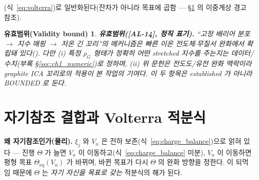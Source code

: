 \documentclass[11pt,a4paper]{article}
\newtheorem*{boundbox}{유효범위(Validity bound)}
\newcommand{\eq}{\mathrm{eq}}
\newcommand{\AL}[1]{\textsf{[AL-#1]}}
\begin{document}
(식~\eqref{eq:volterra})로 일반화된다(잔차가 아니라 목표에 곱함 — \S\ref{sec:volterra} 의 이중계상 경고 참조).
\begin{boundbox}
\textbf{유효범위(\AL{14}, 정직 표기).} ``고정 배리어 분포 $\to$ 지수 매핑 $\to$ 저온 긴 꼬리''의 메커니즘은
빠른 이온 전도체$\cdot$무질서 완화에서 확립돼 있다(\cite{svare2000,johnston2006,lindsey1980}). 다만 (i)
특정 $\rho_G$ 형태가 \emph{정확히 어떤} stretched 지수를 주는지는 데이터/수치(부록 \S\ref{sec:ch1_numeric})로 정하며, (ii) 위
문헌은 전도도/유전 완화 맥락이라 graphite ICA 꼬리로의 \emph{적용}이 본 작업의 기여다. 이 두 항목은
established 가 아니라 BOUNDED 로 둔다.
\end{boundbox}

\section{자기참조 결합과 Volterra 적분식}\label{sec:volterra}
\textbf{왜 자기참조인가(물리).} $\xi_j$ 와 $V_n$ 은 전하 보존(식~\eqref{eq:charge_balance})으로 얽혀 있다 — 진행
$\Theta$ 가 늘면 $V_n$ 이 이동하고(식~\eqref{eq:charge_balance} 미분), $V_n$ 이 이동하면 평형 목표
$\Theta_\eq(V_n)$ 가 바뀌며, 바뀐 목표가 다시 $\Theta$ 의 완화 방향을 정한다. 이 되먹임 때문에 $\Theta$ 는 \emph{자기
자신을 목표로 갖는} 적분식의 해가 된다.
\end{document}

